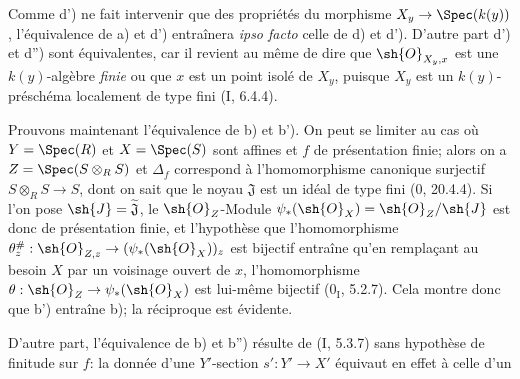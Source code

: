 Comme d') ne fait intervenir que des propriétés du morphisme $X_y\to\Spec(k(y))$, l'équivalence de a) et d') entraînera \emph{ipso facto} celle de d) et d'). D'autre part d') et d'') sont équivalentes, car il revient au même de dire que $\sh{O}_{X_y,x}$ est une $k(y)$-algèbre \emph{finie} ou que $x$ est un point isolé de $X_y$, puisque $X_y$ est un $k(y)$-préschéma localement de type fini (I, 6.4.4).

Prouvons maintenant l'équivalence de b) et b'). On peut se limiter au cas où $Y=\Spec(R)$ et $X=\Spec(S)$ sont affines et $f$ de présentation finie; alors on a $Z=\Spec(S\otimes_R S)$ et $\Delta_f$ correspond à l'homomorphisme canonique surjectif $S\otimes_R S\to S$, dont on sait que le noyau $\mathfrak{J}$ est un idéal de type fini (0, 20.4.4). Si l'on pose $\sh{J}=\widetilde{\mathfrak{J}}$, le $\sh{O}_Z$-Module $\psi_*(\sh{O}_X)=\sh{O}_Z/\sh{J}$ est donc de présentation finie, et l'hypothèse que l'homomorphisme $\theta_z^\#: \sh{O}_{Z,z}\to(\psi_*(\sh{O}_X))_z$ est bijectif entraîne qu'en remplaçant au besoin $X$ par un voisinage ouvert de $x$, l'homomorphisme $\theta:\sh{O}_Z\to\psi_*(\sh{O}_X)$ est lui-même bijectif ($0_{\mathrm I}$, 5.2.7). Cela montre donc que b') entraîne b); la réciproque est évidente.

D'autre part, l'équivalence de b) et b'') résulte de (I, 5.3.7) sans hypothèse de finitude sur $f$: la donnée d'une $Y'$-section $s':Y'\to X'$ équivaut en effet à celle d'un

